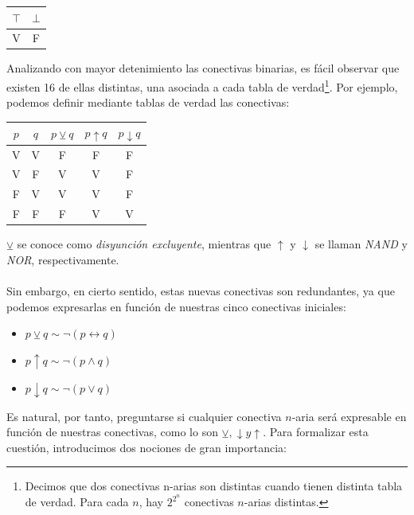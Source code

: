 \begin{table}[H]
\begin{center}
\begin{tabular}{|c|c|}
\hline 
$\top$ & $\bot$\\
\hline \hline
V & F\\ \hline
\end{tabular}
\end{center}
\end{table}

Analizando con mayor detenimiento las conectivas binarias, es fácil observar que existen 16 de ellas distintas, una asociada a cada tabla de verdad\footnote{Decimos que dos conectivas n-arias son distintas cuando tienen distinta tabla de verdad. Para cada $n$, hay $2^{2^n}$ conectivas $n$-arias distintas.}. Por ejemplo, podemos definir mediante tablas de verdad las conectivas:

\begin{table}[H]
\begin{center}
\begin{tabular}{|c|c|c|c|c|}
\hline
$p$ & $q$ & $p \veebar q$ & $p\uparrow q$ & $p\downarrow q$\\
\hline \hline
V & V & F & F & F\\ \hline
V & F & V & V & F\\ \hline
F & V & V & V & F\\ \hline
F & F & F & V & V\\ \hline
\end{tabular}
\end{center}
\end{table}
\noindent $\veebar$ se conoce como \textit{disyunción excluyente}, mientras que $\uparrow$ y $\downarrow$ se llaman \textit{NAND} y \textit{NOR}, respectivamente.  \\ \\
Sin embargo, en cierto sentido, estas nuevas conectivas son redundantes, ya que podemos expresarlas en función de nuestras cinco conectivas iniciales:
\begin{itemize}
    \item $p\veebar q \sim \neg(p\leftrightarrow q) $
    \item $p\uparrow q \sim \neg(p\land q) $
    \item $p\downarrow q \sim \neg(p\lor q) $
\end{itemize}

\noindent Es natural, por tanto, preguntarse si cualquier conectiva $n$-aria será expresable en función de nuestras conectivas, como lo son $\veebar,\downarrow y\uparrow$. Para formalizar esta cuestión, introducimos dos nociones de gran importancia:

